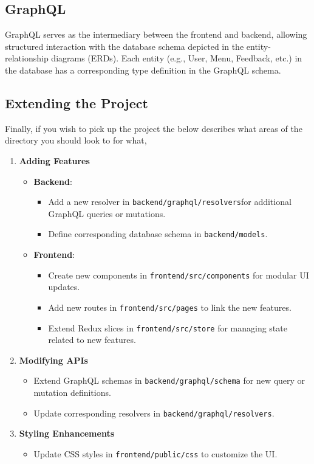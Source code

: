 \documentclass[10pt,twocolumn]{article}
\begin{document}
\subsection{GraphQL}
GraphQL serves as the intermediary between the frontend and backend, allowing structured interaction with the database schema depicted in the entity-relationship diagrams (ERDs). Each entity (e.g., User, Menu, Feedback, etc.) in the database has a corresponding type definition in the GraphQL schema.

\subsection{Extending the Project}
Finally, if you wish to pick up the project the below describes what areas of the directory you should look to for what,
\begin{enumerate}
    \item \textbf{Adding Features}
    \begin{itemize}
        \item \textbf{Backend}:
        \begin{itemize}
        \item Add a new resolver in \texttt{backend/graphql/resolvers}for additional GraphQL queries or mutations.
        \item Define corresponding database schema in \texttt{backend/models}.
        \end{itemize}
        \item \textbf{Frontend}:
        \begin{itemize}
            \item Create new components in \texttt{frontend/src/components} for modular UI updates.
            \item Add new routes in \texttt{frontend/src/pages} to link the new features.
            \item Extend Redux slices in \texttt{frontend/src/store} for managing state related to new features.
        \end{itemize}
    \end{itemize}
    \item \textbf{Modifying APIs}
    \begin{itemize}
        \item Extend GraphQL schemas in \texttt{backend/graphql/schema} for new query or mutation definitions.
        \item Update corresponding resolvers in \texttt{backend/graphql/resolvers}.
    \end{itemize}
    \item \textbf{Styling Enhancements}
    \begin{itemize}
        \item Update CSS styles in \texttt{frontend/public/css} to customize the UI.
    \end{itemize}
\end{enumerate}
\end{document}
